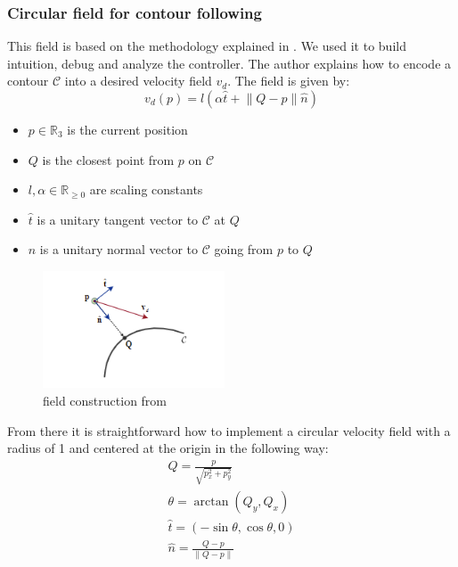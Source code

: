 \subsubsection{Circular field for contour following}
This field is based on the methodology explained in \cite{asl2019assistive}. We used it to build intuition, debug and analyze the controller.
The author explains how to encode a contour $\mathcal{C}$ into a desired velocity field $v_d$.
The field is given by: 
\begin{equation}
    v_d(p) = l(\alpha \hat{t} + \lVert Q-p \rVert \hat{n}) \label{eqn:circularfieldcons}
\end{equation}
\begin{itemize}
    \item $p\in \mathbb{R}_3$ is the current position
    \item $Q$ is the closest point from $p$ on $\mathcal{C}$
    \item $l , \alpha \in \mathbb{R}_{\geq 0}$ are scaling constants
    \item $\hat{t}$ is a unitary tangent vector to $\mathcal{C}$ at $Q$
    \item $\hat{n}$ is a unitary normal vector to $\mathcal{C}$ going from $p$ to $Q$
\end{itemize}

\begin{figure}[h!]
    \centering
    \includegraphics[width=0.48\textwidth]{Images/fieldconstruction.png}
    \caption{field construction from \cite{asl2019assistive}}
    \label{fig:fieldconstruction}
\end{figure} 

From there it is straightforward how to implement a circular velocity field with a radius of 1 and centered at the origin in the following way:
\begin{align}
    Q = \frac{p}{\sqrt{p_x^2 + p_y^2}}\\
    \theta = \arctan(Q_y, Q_x) \\
    \hat{t} = (-\sin{\theta}, \cos{\theta}, 0) \\
    \hat{n} = \frac{Q-p}{\lVert Q-p \rVert}
\end{align}
